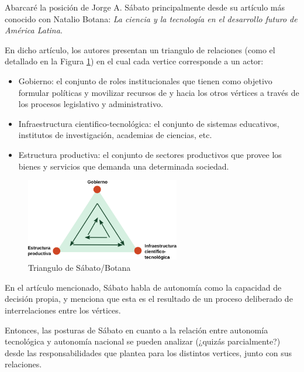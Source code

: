 Abarcaré la posición de Jorge A. Sábato principalmente desde su artículo más conocido con Natalio Botana: \textit{La ciencia y
la tecnología en el desarrollo futuro de América Latina}.

En dicho artículo, los autores presentan un triangulo de relaciones (como el detallado en la Figura \ref{triangulo}) en el cual cada vertice
corresponde a un actor:
\begin{itemize}
    \item Gobierno: el conjunto de roles institucionales que tienen como objetivo formular políticas y movilizar recursos de y hacia los otros vértices a través de los procesos legislativo y administrativo.
    \item Infraestructura cientifico-tecnológica: el conjunto de sistemas educativos, institutos de investigación, academias de ciencias, etc.
    \item Estructura productiva: el conjunto de sectores productivos que provee los bienes y servicios que demanda una determinada sociedad.
\end{itemize}

\begin{figure}[H]
    \centering
    \includegraphics[width=0.6\textwidth]{imagenes/sabato.png}
    \caption{Triangulo de Sábato/Botana}\label{triangulo}
\end{figure}


En el artículo mencionado, Sábato habla de autonomía como la capacidad de decisión propia, y menciona que esta es el resultado de un proceso deliberado de interrelaciones entre los vértices.

Entonces, las posturas de Sábato en cuanto a la relación entre autonomía tecnológica y
autonomía nacional se pueden analizar (¿quizás parcialmente?) desde las responsabilidades que plantea para los distintos vertices, junto con sus relaciones.

